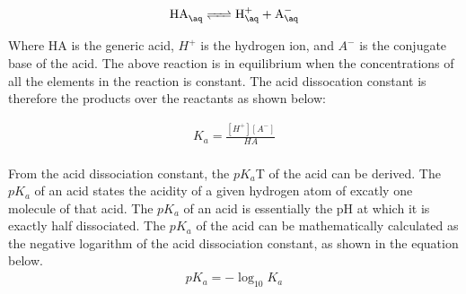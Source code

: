 \documentclass{article}
\begin{document}
\begin{eqnarray*}
\ce{ HA_{\aq} <=> H^{+}_{\aq} + A^{-}_{\aq} }
\end{eqnarray*}

\noindent
Where HA is the generic acid, $H^+$ is the hydrogen ion, and $A^-$ is the conjugate base of the acid. The above reaction is in equilibrium when the concentrations of all the elements in the reaction is constant. The acid dissocation constant is therefore the products over the reactants as shown below:

\begin{eqnarray*}
K_a = \frac{[H^+][A^-]}{HA}
\end{eqnarray*} \\

\noindent
From the acid dissociation constant, the $pK_a$T of the acid can be derived. The $pK_a$ of an acid states the acidity of a given hydrogen atom of excatly one molecule of that acid. The $pK_a$ of an acid is essentially the pH at which it is exactly half dissociated. The $pK_a$ of the acid can be mathematically calculated as the negative logarithm of the acid dissociation constant, as shown in the equation below. 
\begin{eqnarray*}
pK_a = -\log_{10}K_a
\end{eqnarray*} \\
\end{document}
